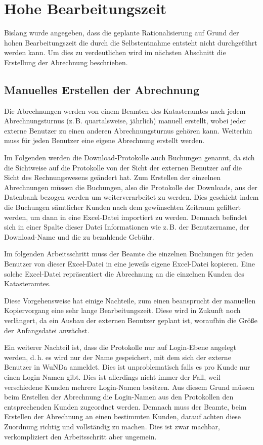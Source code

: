 \section{Hohe Bearbeitungszeit}

Bislang wurde angegeben, dass die geplante Rationalisierung auf Grund der hohen Bearbeitungszeit die durch die Selbstentnahme entsteht nicht durchgeführt werden kann. Um dies zu verdeutlichen wird im nächsten Abschnitt die Erstellung der Abrechnung beschrieben. 

\subsection{Manuelles Erstellen der Abrechnung}
Die Abrechnungen werden von einem Beamten des Katasteramtes nach jedem Abrechnungsturnus (z.\,B. quartalsweise, jährlich) manuell erstellt, wobei jeder externe Benutzer zu einen anderen Abrechnungsturnus gehören kann.
Weiterhin muss für jeden Benutzer eine eigene Abrechnung erstellt werden.

Im Folgenden werden die Download-Protokolle auch Buchungen genannt, da sich die Sichtweise auf die Protokolle von der Sicht der externen Benutzer auf die Sicht des Rechnungswesens geändert hat.
Zum Erstellen der einzelnen Abrechnungen müssen die Buchungen, also die Protokolle der Downloads, aus der Datenbank bezogen werden um weiterverarbeitet zu werden.
Dies geschieht indem die Buchungen sämtlicher Kunden nach dem gewünschten Zeitraum gefiltert werden, um dann in eine Excel-Datei importiert zu werden.
Demnach befindet sich in einer Spalte dieser Datei Informationen wie z.\,B. der Benutzername, der Download-Name und die zu bezahlende Gebühr.

Im folgenden Arbeitsschritt muss der Beamte die einzelnen Buchungen für jeden Benutzer von dieser Excel-Datei in eine jeweils eigene Excel-Datei kopieren. Eine solche Excel-Datei repräsentiert die Abrechnung an die einzelnen Kunden des Katasteramtes.

Diese Vorgehensweise hat einige Nachteile, zum einen beansprucht der manuellen Kopiervorgang eine sehr lange Bearbeitungszeit. Diese wird in Zukunft noch verlängert, da ein Ausbau der externen Benutzer geplant ist, woraufhin die Größe der Anfangsdatei anwächst.

Ein weiterer Nachteil ist, dass die Protokolle nur auf Login-Ebene angelegt werden, d.\,h. es wird nur der Name gespeichert, mit dem sich der externe Benutzer in \ac{WuNDa} anmeldet.
Dies ist unproblematisch falls es pro Kunde nur einen Login-Namen gibt.
Dies ist allerdings nicht immer der Fall, weil verschiedene Kunden mehrere Login-Namen besitzen.
Aus diesem Grund müssen beim Erstellen der Abrechnung die Login-Namen aus den Protokollen den entsprechenden Kunden zugeordnet werden.
Demnach muss der Beamte, beim Erstellen der Abrechnung an einen bestimmten Kunden, darauf achten diese Zuordnung richtig und vollständig zu machen.
Dies ist zwar machbar, verkompliziert den Arbeitsschritt aber ungemein.

